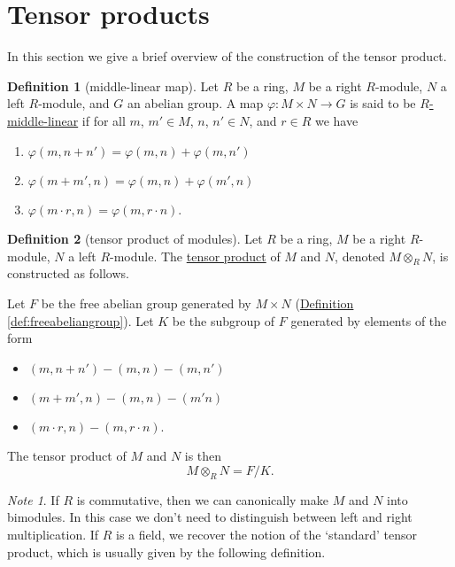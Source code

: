 \documentclass[a4paper]{report}
\newcommand{\defn}[1]{\ul{#1}}
\theoremstyle{definition}
\newtheorem{definition}{Definition}[section]
\theoremstyle{plain}
\theoremstyle{remark}
\newtheorem{note}{Note}[section]
\begin{document}
\section{Tensor products}
In this section we give a brief overview of the construction of the tensor product.

\begin{definition}[middle-linear map]
  \label{def:middlelinearmap}
  Let $R$ be a ring, $M$ be a right $R$-module, $N$ a left $R$-module, and $G$ an abelian group. A map $\varphi\colon M \times N \to G$ is said to be \defn{$R$-middle-linear} if for all $m$, $m' \in M$, $n$, $n' \in N$, and $r \in R$ we have
  \begin{enumerate}
    \item $\varphi(m, n + n') = \varphi(m, n) + \varphi(m, n')$
    \item $\varphi(m + m', n) = \varphi(m, n) + \varphi(m', n)$
    \item $\varphi(m \cdot r, n) = \varphi(m, r \cdot n)$.
  \end{enumerate}
\end{definition}

\begin{definition}[tensor product of modules]
  \label{def:tensorproductofmodules}
  Let $R$ be a ring, $M$ be a right $R$-module, $N$ a left $R$-module. The \defn{tensor product} of $M$ and $N$, denoted $M \otimes_{R} N$, is constructed as follows.

  Let $F$ be the free abelian group generated by $M \times N$ (\hyperref[def:freeabeliangroup]{Definition \ref*{def:freeabeliangroup}}). Let $K$ be the subgroup of $F$ generated by elements of the form
  \begin{itemize}
    \item $(m, n + n') - (m, n) - (m, n')$
    \item $(m + m', n) - (m, n) - (m' n)$
    \item $(m \cdot r, n) - (m, r \cdot n)$.
  \end{itemize}

  The tensor product of $M$ and $N$ is then
  \begin{equation*}
    M \otimes_{R} N = F / K.
  \end{equation*}
\end{definition}

\begin{note}
  If $R$ is commutative, then we can canonically make $M$ and $N$ into bimodules. In this case we don't need to distinguish between left and right multiplication. If $R$ is a field, we recover the notion of the `standard' tensor product, which is usually given by the following definition.
\end{note}
\end{document}

